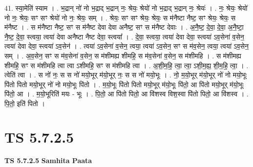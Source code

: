 \documentclass[17pt]{extarticle}
\begin{document}
41. स्या॒मेति॑ स्याम । . भ॒द्रान् नो॑ नो भ॒द्राद् भ॒द्रान् नः॒ श्रेयः॒ श्रेयो॑ नो भ॒द्राद् भ॒द्रान् नः॒ श्रेयः॑ । . नः॒ श्रेयः॒ श्रेयो॑ नो नः॒ श्रेयः॒ सꣳ सꣳ श्रेयो॑ नो नः॒ श्रेयः॒ सम् । . श्रेयः॒ सꣳ सꣳ श्रेयः॒ श्रेयः॒ स म॑नैष्टा नैष्ट॒ सꣳ श्रेयः॒ श्रेयः॒ स म॑नैष्ट । . स म॑नैष्टा नैष्ट॒ सꣳ स म॑नैष्ट देवा देवा अनैष्ट॒ सꣳ स म॑नैष्ट देवाः । . अ॒नै॒ष्ट॒ दे॒वा॒ दे॒वा॒ अ॒नै॒ष्टा॒ नै॒ष्ट॒ दे॒वा॒ स्त्वया॒ त्वया॑ देवा अनैष्टा नैष्ट देवा॒ स्त्वया᳚ । . दे॒वा॒ स्त्वया॒ त्वया॑ देवा देवा॒ स्त्वया॑ ऽव॒सेना॑ व॒सेन॒ त्वया॑ देवा देवा॒ स्त्वया॑ ऽव॒सेन॑ । . त्वया॑ ऽव॒सेना॑ व॒सेन॒ त्वया॒ त्वया॑ ऽव॒सेन॒ सꣳ स म॑व॒सेन॒ त्वया॒ त्वया॑ ऽव॒सेन॒ सम् । . अ॒व॒सेन॒ सꣳ स म॑व॒सेना॑ व॒सेन॒ स म॑शीमह्य शीमहि॒ स म॑व॒सेना॑ व॒सेन॒ स म॑शीमहि । . स म॑शीमह्य शीमहि॒ सꣳ स म॑शीमहि त्वा त्वा ऽशीमहि॒ सꣳ स म॑शीमहि त्वा । . अ॒शी॒म॒हि॒ त्वा॒ त्वा॒ ऽशी॒म॒ह्य॒ शी॒म॒हि॒ त्वा॒ । . त्वेति॑ त्वा । . स नो॑ नः॒ स स नो॑ मयो॒भूर् म॑यो॒भूर् नः॒ स स नो॑ मयो॒भूः । . नो॒ म॒यो॒भूर् म॑यो॒भूर् नो॑ नो मयो॒भूः पि॑तो पितो मयो॒भूर् नो॑ नो मयो॒भूः पि॑तो । . म॒यो॒भूः पि॑तो पितो मयो॒भूर् म॑यो॒भूः पि॑तो॒ आ पि॑तो मयो॒भूर् म॑यो॒भूः पि॑तो॒ आ । . म॒यो॒भूरिति॑ मयः - भूः । . पि॒तो॒ आ पि॑तो पितो॒ आ वि॑शस्व विश॒स्वा पि॑तो पितो॒ आ वि॑शस्व । . पि॒तो॒ इति॑ पितो । \newline
\pagebreak
{}

\section{ TS 5.7.2.5 }

\textbf{TS 5.7.2.5 } \newline
\textbf{Samhita Paata} \newline
\end{document}
